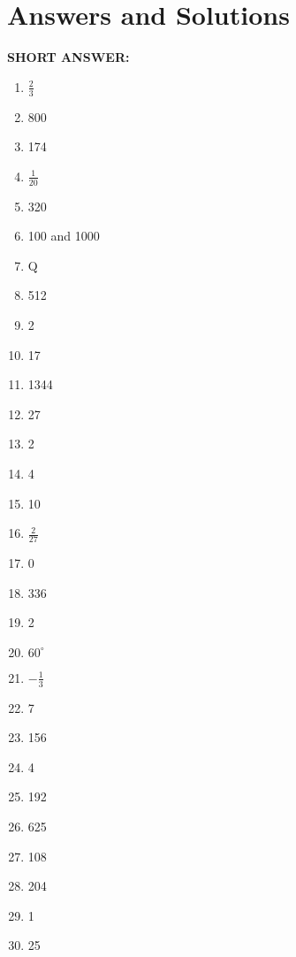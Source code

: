 \documentclass[a4paper]{article}
\begin{document}
\section{Answers and Solutions}
\noindent\textbf{SHORT ANSWER:}\begin{multicols}{2}\begin{enumerate}
\item $\frac23$
\item 800
\item 174
\item $\frac1{20}$
\item 320
\item 100 and 1000
\item Q
\item 512
\item 2
\item 17
\item 1344
\item 27
\item 2
\item 4
\item 10
\item $\frac{2}{27}$
\item 0
\item 336
\item 2
\item $60^\circ$
\item $-\frac13$
\item 7
\item 156
\item 4
\item 192
\item 625
\item 108
\item 204
\item 1
\item 25\end{enumerate}\end{multicols}
\end{document}
